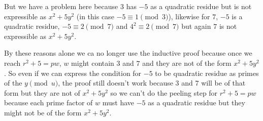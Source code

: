 \documentclass[aps,preprint,preprintnumbers,nofootinbib,showpacs,prd]{revtex4-1}
\begin{document}
But we have a problem here because $3$ has $-5$ as a quadratic residue but is not expressible as $x^2 + 5y^2$ (in this case $-5 \equiv 1 \pmod{3}$), likewise for $7$, $-5$ is a quadratic residue, $-5 \equiv 2 \pmod{7}$ and $4^2 \equiv 2 \pmod{7}$ but again $7$ is not expressible as $x^2 + 5y^2$.

By these reasons alone we ca no longer use the inductive proof because once we reach $r^2 + 5 = pw$, $w$ might contain $3$ and $7$ and they are not of the form $x^2 + 5y^2$. So even if we can express the condition for $-5$ to be quadratic residue as primes of the $y \pmod{u}$, the proof still doesn't work because $3$ and $7$ will be of that form but they are not of $x^2 + 5y^2$ so we can't do the peeling step for $r^2 + 5 = pw$ because each prime factor of $w$ must have $-5$ as a quadratic residue but they might not be of the form $x^2 + 5y^2$.
\end{document}
